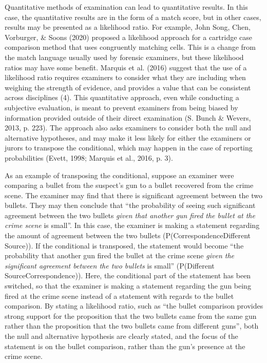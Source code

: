\documentclass[print]{nuthesis}
\begin{document}
Quantitative methods of examination can lead to quantitative results.
In this case, the quantitative results are in the form of a match score, but in other cases, results may be presented as a likelihood ratio.
For example, John Song, Chen, Vorburger, \& Soons (2020) proposed a likelihood approach for a cartridge case comparison method that uses congruently matching cells.
This is a change from the match language usually used by forensic examiners, but these likelihood ratios may have some benefit.
Marquis et al. (2016) suggest that the use of a likelihood ratio requires examiners to consider what they are including when weighing the strength of evidence, and provides a value that can be consistent across disciplines (4).
This quantitative approach, even while conducting a subjective evaluation, is meant to prevent examiners from being biased by information provided outside of their direct examination (S. Bunch \& Wevers, 2013, p. 223).
The approach also asks examiners to consider both the null and alternative hypotheses, and may make it less likely for either the examiners or jurors to transpose the conditional, which may happen in the case of reporting probabilities (Evett, 1998; Marquis et al., 2016, p. 3).

As an example of transposing the conditional, suppose an examiner were comparing a bullet from the suspect's gun to a bullet recovered from the crime scene.
The examiner may find that there is significant agreement between the two bullets.
They may then conclude that ``the probability of seeing such significant agreement between the two bullets \emph{given that another gun fired the bullet at the crime scene} is small''.
In this case, the examiner is making a statement regarding the amount of agreement between the two bullets (P(Correspondence\textbar Different Source)).
If the conditional is transposed, the statement would become ``the probability that another gun fired the bullet at the crime scene \emph{given the significant agreement between the two bullets} is small'' (P(Different Source\textbar Correspondence)).
Here, the conditional part of the statement has been switched, so that the examiner is making a statement regarding the gun being fired at the crime scene instead of a statement with regards to the bullet comparison.
By stating a likelihood ratio, such as ``the bullet comparison provides strong support for the proposition that the two bullets came from the same gun rather than the proposition that the two bullets came from different guns'', both the null and alternative hypothesis are clearly stated, and the focus of the statement is on the bullet comparison, rather than the gun's presence at the crime scene.
\end{document}

